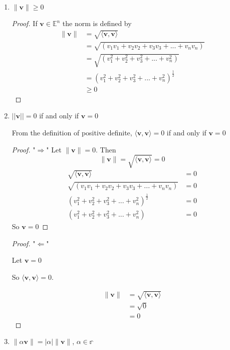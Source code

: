 \documentclass{tufte-book}
\theoremstyle{mytheoremstyle}
\theoremstyle{mylemstyle}
\theoremstyle{mydefstyle}
\begin{document}
\begin{enumerate}

\item $\|\mathbf{v}\| \geq 0$

\begin{proof}
If $\mathbf{v} \in \mathbb{E}^n$ the norm is defined by
\begin{align*}
\|\mathbf{v}\| &= \sqrt{\langle \mathbf{v}, \mathbf{v} \rangle}\\
&= \sqrt{(v_1v_1 + v_2v_2 + v_3v_3 +...+v_nv_n)} \\
&= \sqrt{(v_1^2 + v_2^2 + v_3^2 +...+v_n^2)} \\
&= (v_1^2 + v_2^2 + v_3^2 +...+v_n^2)^{\frac{1}{2}} \\
&\geq 0
\end{align*}
\end{proof}

\item $||\mathbf{v}|| = 0$ if and only if $\mathbf{v} = 0$

From the definition of positive definite, $\langle \mathbf{v}, \mathbf{v} \rangle = 0$ if and only if $\mathbf{v} = 0$ 
\begin{proof} "$\Rightarrow$"
Let $\|\mathbf{v}\| = 0$.  Then 
\[ \|\mathbf{v}\| = \sqrt{\langle \mathbf{v}, \mathbf{v} \rangle} = 0 \]
\begin{align*}
\sqrt{\langle \mathbf{v}, \mathbf{v} \rangle} &= 0\\
\sqrt{(v_1v_1 + v_2v_2 + v_3v_3 +...+v_nv_n)} &= 0\\
(v_1^2 + v_2^2 + v_3^2 +...+v_n^2)^{\frac{1}{2}} &= 0 \\
(v_1^2 + v_2^2 + v_3^2 +...+v_n^2)&= 0
\end{align*}
So $\mathbf{v} = 0$
\end{proof}

\begin{proof} "$\Leftarrow$"

Let $\mathbf{v} = 0$

So $\langle \mathbf{v}, \mathbf{v} \rangle = 0$. 

\begin{align*}
\|\mathbf{v}\| &= \sqrt{\langle \mathbf{v}, \mathbf{v} \rangle} \\ 
&= \sqrt{0} \\
&= 0
\end{align*}
\end{proof}

\item $\|\alpha \mathbf{v}\| = |\alpha| \|\mathbf{v}\|$, $\alpha \in \mathbb{r}$ 


\end{enumerate}
\end{document}
